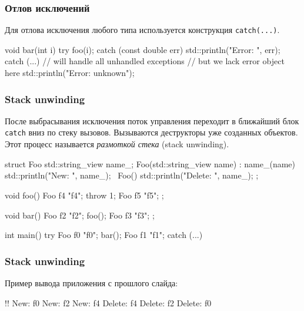 \documentclass[compress, 8pt, aspectratio=169]{beamer}
\begin{document}
  \begin{frame}[fragile]

    \frametitle{Отлов исключений}

    Для отлова исключения любого типа используется конструкция
    \texttt{catch(...)}.

    \begin{myinplacelisting}[minted language=cpp]
void bar(int i) {
    try {
        foo(i);
    }
    catch (const double err) {
        std::println("Error: {}", err);
    }
    catch (...) {
        // will handle all unhandled exceptions
        // but we lack error object here
        std::println("Error: unknown");
    }
}
    \end{myinplacelisting}

  \end{frame}

  \begin{frame}[fragile]

    \frametitle{Stack unwinding}

    После выбрасывания исключения поток управления переходит
    в ближайший блок \texttt{catch} вниз по стеку вызовов.
    Вызываются деструкторы уже созданных объектов.
    Этот процесс называется \textit{размоткой стека} (stack
    unwinding).

    \begin{myinplacelisting}[minted language=cpp]
struct Foo {
  std::string_view name_;
  Foo(std::string_view name) : name_(name) {
    std::println("New: {}", name_);
  }
  ~Foo() { std::println("Delete: {}", name_); }
};

void foo() { Foo f4 {"f4"}; throw 1; Foo f5 {"f5"}; };

void bar() { Foo f2 {"f2"}; foo(); Foo f3 {"f3"}; };

int main() {
  try { Foo f0 {"f0"}; bar(); Foo f1 {"f1"}; }
  catch (...) {}
}
    \end{myinplacelisting}

  \end{frame}

  \begin{frame}[fragile]

    \frametitle{Stack unwinding}

    Пример вывода приложения с прошлого слайда:

    \begin{terminalwindow}
!!
New: f0
New: f2
New: f4
Delete: f4
Delete: f2
Delete: f0
    \end{terminalwindow}

  \end{frame}
\end{document}

